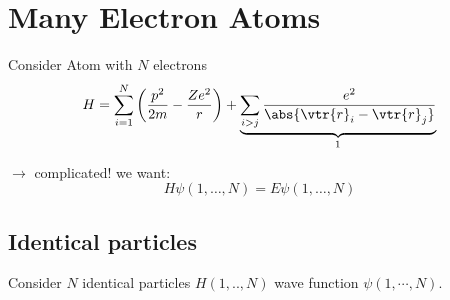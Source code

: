 \chapter{Many Electron Atoms}
Consider Atom with $N$ electrons
\begin{dmath}[]
	H=\sum_{i=1}^{N}\left( \frac{p^2}{2m}-\frac{Ze^2}{r} \right)+\underbrace{\sum_{i>j}^{}\frac{e^2}{\abs{\vtr{r}_i-\vtr{r}_j}}}_{\footnotemark}
\end{dmath}
 $\to$ complicated! we want:
\begin{dmath}[]
	H\psi\left( 1,\ldots,N \right)=E\psi\left( 1,\ldots,N \right)
\end{dmath}
\section{Identical particles}
Consider $N$ identical particles $H\left( 1,..,N \right)$ wave function $\psi\left( 1,\cdots,N \right)$.

